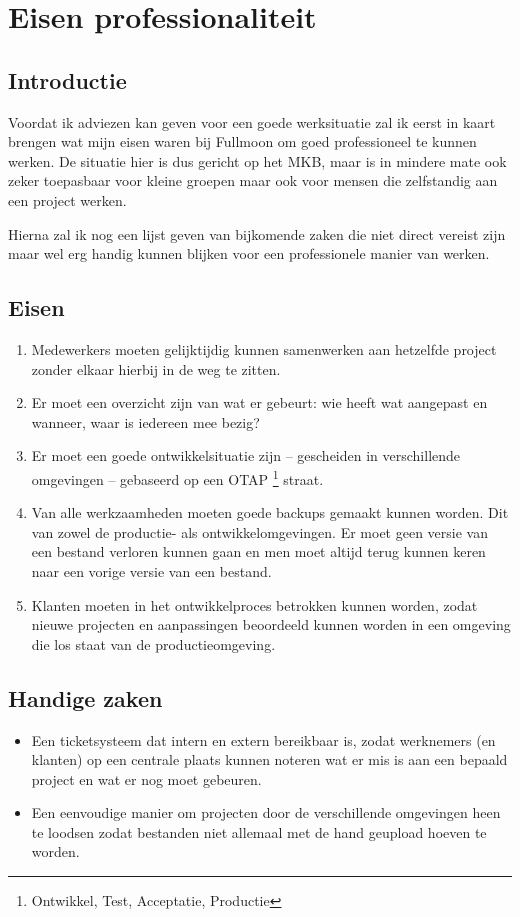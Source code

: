 \chapter{Eisen professionaliteit}

\section{Introductie}

Voordat ik adviezen kan geven voor een goede werksituatie zal ik eerst in kaart brengen wat mijn eisen waren bij Fullmoon om goed professioneel te kunnen werken. De situatie hier is dus gericht op het MKB, maar is in mindere mate ook zeker toepasbaar voor kleine groepen maar ook voor mensen die zelfstandig aan een project werken.

Hierna zal ik nog een lijst geven van bijkomende zaken die niet direct vereist zijn maar wel erg handig kunnen blijken voor een professionele manier van werken.

\section{Eisen}

\begin{enumerate}
  \item Medewerkers moeten gelijktijdig kunnen samenwerken aan hetzelfde project zonder elkaar hierbij in de weg te zitten.
  \item Er moet een overzicht zijn van wat er gebeurt: wie heeft wat aangepast en wanneer, waar is iedereen mee bezig?
  \item Er moet een goede ontwikkelsituatie zijn -- gescheiden in verschillende omgevingen -- gebaseerd op een OTAP \footnote{Ontwikkel, Test, Acceptatie, Productie} straat.
  \item Van alle werkzaamheden moeten goede backups gemaakt kunnen worden. Dit van zowel de productie- als ontwikkelomgevingen. Er moet geen versie van een bestand verloren kunnen gaan en men moet altijd terug kunnen keren naar een vorige versie van een bestand.
  \item Klanten moeten in het ontwikkelproces betrokken kunnen worden, zodat nieuwe projecten en aanpassingen beoordeeld kunnen worden in een omgeving die los staat van de productieomgeving.
\end{enumerate}

\section{Handige zaken}

\begin{itemize}
  \item Een ticketsysteem dat intern en extern bereikbaar is, zodat werknemers (en klanten) op een centrale plaats kunnen noteren wat er mis is aan een bepaald project en wat er nog moet gebeuren.
  \item Een eenvoudige manier om projecten door de verschillende omgevingen heen te loodsen zodat bestanden niet allemaal met de hand geupload hoeven te worden.
\end{itemize}
